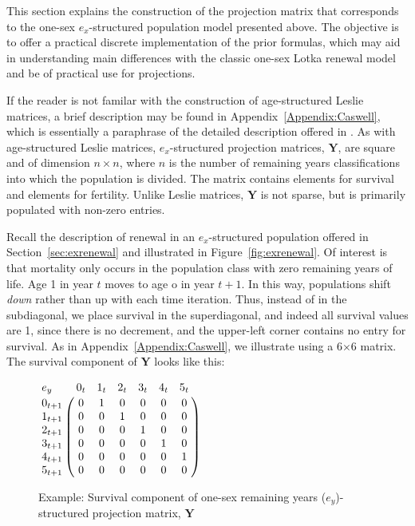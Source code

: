 
This section explains the construction of the projection matrix that corresponds
to the one-sex $e_x$-structured population model presented above. The objective is
to offer a practical discrete implementation of the prior
formulas, which may aid in understanding main differences with the classic
one-sex Lotka renewal model and be of practical use for projections.

If the reader is not familar with the construction
of age-structured Leslie matrices, a brief description may be found in
Appendix~\ref{Appendix:Caswell}, which is essentially a paraphrase of the
detailed description offered in \cite{caswell2001matrix}. As with
age-structured Leslie matrices, $e_x$-structured projection matrices,
$\textbf{Y}$, are square and of dimension $n \times n$, where $n$ is the number
of remaining years classifications into which the population is divided. The matrix contains
elements for survival and elements for fertility. Unlike Leslie matrices,
$\textbf{Y}$ is not sparse, but is primarily populated with non-zero entries.

Recall the description of renewal in an $e_x$-structured population offered in
Section~\ref{sec:exrenewal} and illustrated in Figure~\ref{fig:exrenewal}. Of
interest is that mortality only occurs in the population class with zero
remaining years of life. Age 1 in year $t$ moves to age o in year $t+1$. In this
way, populations shift \textit{down} rather than up with each time iteration.
Thus, instead of in the subdiagonal, we place survival in the superdiagonal, and
indeed all survival values are 1, since there is no decrement, and the
upper-left corner contains no entry for survival. As in
Appendix~\ref{Appendix:Caswell}, we illustrate using a 6$\times$6 matrix. The
survival component of $\textbf{Y}$ looks like this:


\begin{figure}[h!]
\centering
\caption*{Example: Survival component of one-sex remaining years
($e_y$)-structured projection matrix, $\textbf{Y}$} 

$\bordermatrix{{e_y } & 0_t & 1_t & 2_t & 3_t & 4_t & 5_t\cr 
                0_{t+1} & 0    &  1   & 0    & 0    & 0    & 0   \cr
                1_{t+1} & 0    &  0   & 1    & 0    & 0    & 0   \cr 
                2_{t+1} & 0    &  0   & 0    & 1    & 0    & 0   \cr 
                3_{t+1} & 0    &  0   & 0    & 0    & 1    & 0   \cr 
                4_{t+1} & 0    &  0   & 0    & 0    & 0    & 1   \cr
                5_{t+1} & 0    &  0   & 0    & 0    & 0    & 0   }$
\end{figure}

